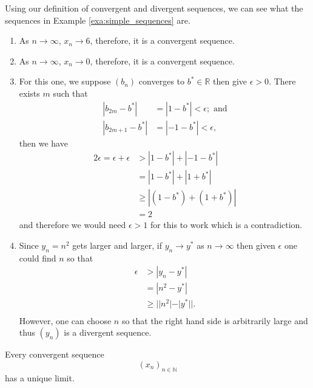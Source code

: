\begin{example}
    Using our definition of convergent and divergent sequences, we can see what the sequences in Example \ref{exa:simple_sequences} are.
    
    \begin{enumerate}
        \item As $n\to\infty$, $x_n\to6$, therefore, it is a convergent sequence.
        
        \item As $n\to\infty$, $x_n\to0$, therefore, it is a convergent sequence.
        
        \item For this one, we suppose $(b_n)$ converges to $b^*\in\mathbb R$ then give $\epsilon>0$. There exists $m$ such that
        \begin{align*}
            |b_{2m}-b^*|&=|1-b^*|<\epsilon;\text{ and}\\
            |b_{2m+1}-b^*|&=|-1-b^*|<\epsilon,
        \end{align*}
        then we have
        \begin{align*}
            2\epsilon=\epsilon+\epsilon&>|1-b^*|+|-1-b^*|\\
            &=|1-b^*|+|1+b^*|\\
            &\geq|(1-b^*)+(1+b^*)|\\
            &=2
        \end{align*}
        and therefore we would need $\epsilon>1$ for this to work which is a contradiction.
        
        \item Since $y_n=n^2$ gets larger and larger, if $y_n\to y^*$ as $n\to\infty$ then given $\epsilon$ one could find $n$ so that
        \begin{align*}
            \epsilon&>|y_n-y^*|\\
            &=|n^2-y^*|\\
            &\geq||n^2|-|y^*||.\\
        \end{align*}
        However, one can choose $n$ so that the right hand side is arbitrarily large and thus $(y_n)$ is a divergent sequence.
    \end{enumerate}
\end{example}

\begin{theorem}
    Every convergent sequence \[(x_n)_{n\in\mathbb N}\] has a unique limit.
\end{theorem}

